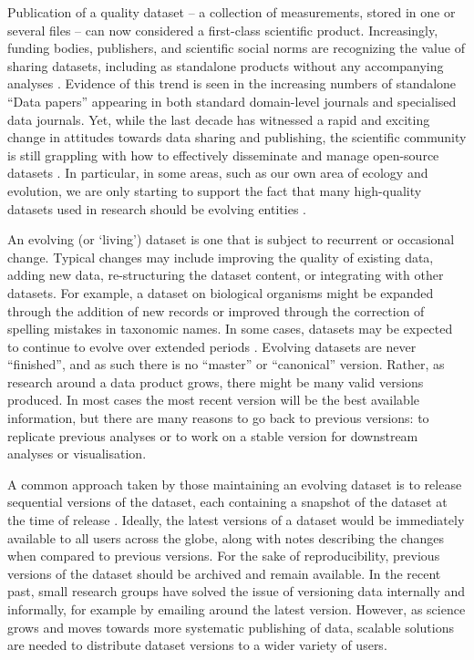 \documentclass[a4paper,num-refs]{assets/oup-contemporary}
\begin{document}
Publication of a quality dataset -- a collection of measurements, stored in one or several files -- can now considered a first-class scientific product. Increasingly, funding bodies, publishers, and scientific social norms are recognizing the value of sharing datasets, including as standalone products without any accompanying analyses \cite{Whitlock-2011,Fairbairn-2011,Piwowar-2011,VanNoorden-2013,Gibney-2013}. Evidence of this trend is seen in the increasing numbers of standalone ``Data papers'' appearing in both standard domain-level journals and specialised data journals. Yet, while the last decade has witnessed a rapid and exciting change in attitudes towards data sharing and publishing, the scientific community is still grappling with how to effectively disseminate and manage open-source datasets \cite{Whitlock-2011, Goodman-2014, Force11-2014, Lowndes-2017, Perkel-2016, VanNoorden-2013, Kratz-2015,Wilkinson-2016, Yenni-2018}. In particular, in some areas, such as our own area of ecology and evolution, we are only starting to support the fact that many high-quality datasets used in research should be evolving entities \cite{Yenni-2018}.

An evolving (or `living') dataset is one that is subject to recurrent or occasional change.  Typical changes may include improving the quality of existing data, adding new data, re-structuring the dataset content, or integrating with other datasets. For example, a dataset on biological organisms might be expanded through the addition of new records or improved through the correction of spelling mistakes in taxonomic names. In some cases, datasets may be expected to continue to evolve over extended periods \cite[e.g.][]{Ernest-2018}. Evolving datasets are never ``finished'', and as such there is no ``master'' or ``canonical'' version. Rather, as research around a data product grows, there might be many valid versions produced.  In most cases the most recent version will be the best available information, but there are many reasons to go back to previous versions: to replicate previous analyses or to work on a stable version for downstream analyses or visualisation.  


A common approach taken by those maintaining an evolving dataset is to release sequential versions of the dataset, each containing a snapshot of the dataset at the time of release \cite[e.g.][]{Falster-2015, Pennell-2015a, Yenni-2018, Abolfathi-2018}. Ideally, the latest versions of a dataset would be immediately available to all users across the globe, along with notes describing the changes when compared to previous versions. For the sake of reproducibility, previous versions of the dataset should be archived and remain available. In the recent past, small research groups have solved the issue of versioning data internally and informally, for example by emailing around the latest version. However, as science grows and moves towards more systematic publishing of data, scalable solutions are needed to distribute dataset versions to a wider variety of users.
\end{document}
